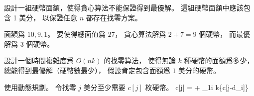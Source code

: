 \startigBase[continue]\startitem
設計一組硬幣面額，使得貪心算法不能保證得到最優解。
這組硬幣面額中應該包含 1 美分，
以保證任意 $n$ 都存在找零方案。
\stopitem\stopigBase

\startANSWER
面額爲 $10,9,1$。
要使得總面值爲 $27$，
貪心算法解爲 $2+7=9$ 個硬幣，
而最優解爲 $3$ 個硬幣。
\stopANSWER

\startigBase[continue]\startitem
設計一個時間複雜度爲 $O(nk)$ 的找零算法，
使得無論 $k$ 種硬幣的面額爲多少，總能得到最優解（硬幣數最少），
假設肯定包含面額爲 $1$ 美分的硬幣。
\stopitem\stopigBase

\startANSWER
使用動態規劃。
令找零 $j$ 美分至少需要 $c[j]$ 枚硬幣。
\startformula
c[j] = \startcases
{} \NC {} \NR
{} + \min_{1\le i \le k}\{c[j-d_i]\} \NC {} \NR
\stopcases\stopformula
\stopANSWER


\stopPROBLEM

